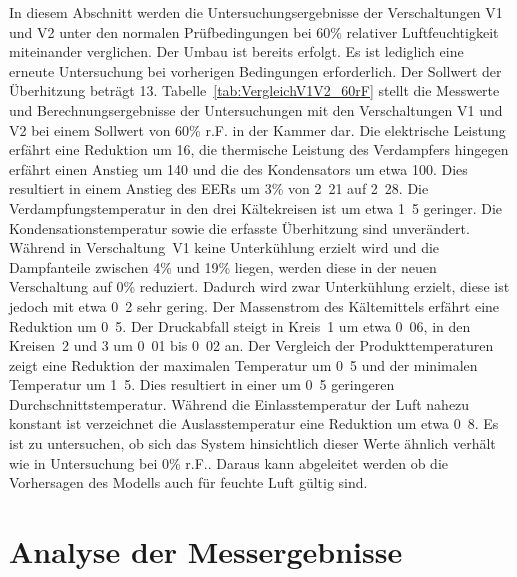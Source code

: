 In diesem Abschnitt werden die Untersuchungsergebnisse der Verschaltungen V1 und V2 unter den normalen Prüfbedingungen bei \unit{60}{\%} relativer Luftfeuchtigkeit miteinander verglichen. Der Umbau ist bereits erfolgt. Es ist lediglich eine erneute Untersuchung bei vorherigen Bedingungen erforderlich. Der Sollwert der Überhitzung beträgt \unit{13}{\kelvin}. \newline
Tabelle~\ref{tab:VergleichV1V2_60rF} stellt die Messwerte und Berechnungsergebnisse der Untersuchungen mit den Verschaltungen V1 und V2 bei einem Sollwert von \unit{60}{\%} r.F. in der Kammer dar. Die elektrische Leistung erfährt eine Reduktion um \unit{16}{\watt}, die thermische Leistung des Verdampfers hingegen erfährt einen Anstieg um \unit{140}{\watt} und die des Kondensators um etwa \unit{100}{\watt}. Dies resultiert in einem Anstieg des EERs um \unit{3}{\%} von \unit{2.21}{} auf \unit{2.28}{}.
Die Verdampfungstemperatur in den drei Kältekreisen ist um etwa \unit{1.5}{\kelvin} geringer. Die Kondensationstemperatur sowie die erfasste Überhitzung sind unverändert.
Während in Verschaltung~V1 keine Unterkühlung erzielt wird und die Dampfanteile zwischen \unit{4}{\%} und \unit{19}{\%} liegen, werden diese in der neuen Verschaltung auf \unit{0}{\%} reduziert. Dadurch wird zwar Unterkühlung erzielt, diese ist jedoch mit etwa \unit{0.2}{\kelvin} sehr gering. Der Massenstrom des Kältemittels erfährt eine Reduktion um \unit{0.5}{\gram\per\second}. Der Druckabfall steigt in Kreis~1 um etwa \unit{0.06}{\bbar}, in den Kreisen~2 und 3 um \unit{0.01}{\bbar} bis \unit{0.02}{\bbar} an. Der Vergleich der Produkttemperaturen zeigt eine Reduktion der maximalen Temperatur um \unit{0.5}{\kelvin} und der minimalen Temperatur um \unit{1.5}{\kelvin}. Dies resultiert in einer um \unit{0.5}{\kelvin} geringeren Durchschnittstemperatur.
Während die Einlasstemperatur der Luft nahezu konstant ist verzeichnet die Auslasstemperatur eine Reduktion um etwa \unit{0.8}{\kelvin}.
Es ist zu untersuchen, ob sich das System hinsichtlich dieser Werte ähnlich verhält wie in Untersuchung bei \unit{0}{\%} r.F.. Daraus kann abgeleitet werden ob die Vorhersagen des Modells auch für feuchte Luft gültig sind.







\chapter{Analyse der Messergebnisse}
\label{cha:Analyse der Messergebnisse}


